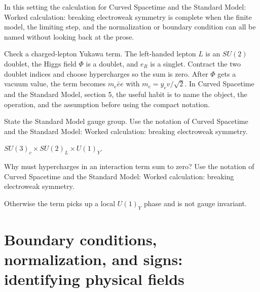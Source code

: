 In this setting the calculation for Curved Spacetime and the Standard Model: Worked calculation: breaking electroweak symmetry is complete when the finite model, the limiting step, and the normalization or boundary condition can all be named without looking back at the prose.




\begin{example}
Check a charged-lepton Yukawa term.  The left-handed lepton \(L\) is an \(SU(2)\) doublet, the Higgs field \(\Phi\) is a doublet, and \(e_R\) is a singlet.  Contract the two doublet indices and choose hypercharges so the sum is zero.  After \(\Phi\) gets a vacuum value, the term becomes \(m_e\bar e e\) with \(m_e=y_ev/\sqrt2\).  In Curved Spacetime and the Standard Model, section 5, the useful habit is to name the object, the operation, and the assumption before using the compact notation.
\end{example}



\begin{exercise}
State the Standard Model gauge group.  Use the notation of Curved Spacetime and the Standard Model: Worked calculation: breaking electroweak symmetry.
\begin{answer}
\(SU(3)_c\times SU(2)_L\times U(1)_Y\).
\end{answer}
\end{exercise}

\begin{exercise}
Why must hypercharges in an interaction term sum to zero?  Use the notation of Curved Spacetime and the Standard Model: Worked calculation: breaking electroweak symmetry.
\begin{answer}
Otherwise the term picks up a local \(U(1)_Y\) phase and is not gauge invariant.
\end{answer}
\end{exercise}



\section{Boundary conditions, normalization, and signs: identifying physical fields}













